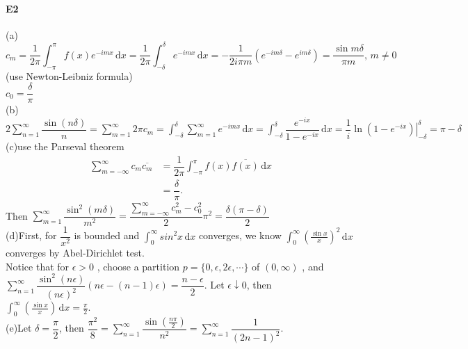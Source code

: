 \documentclass{article}
\begin{document}
\paragraph{E2}
(a) 
\[ c_m=\dfrac{1}{2\pi}\int_{-\pi }^{\pi } f(x)e^{-imx}\, \mathrm{d}x =\dfrac{1 }{2\pi }\int_{-\delta}^{\delta} e^{-imx}\, \mathrm{d}x=-\dfrac{1}{2i\pi m}(e^{-im\delta}-e^{im\delta})=\dfrac{\sin{m\delta}}{\pi m} ,\,m\not=0  \] (use Newton-Leibniz formula) \\ $ c_0=\dfrac{\delta}{\pi } $\\ 
(b) $ 2\sum\limits_{n=1 }^{\infty } \dfrac{\sin(n\delta)}{n}=\sum\limits_{m=1 }^{\infty}2\pi c_m=\int_{-\delta }^{\delta } \sum\limits_{m=1 }^{\infty } e^{-imx}\, \mathrm{d}x=\int_{-\delta }^{\delta } \dfrac{e^{-ix}}{1-e^{-ix}} \, \mathrm{d}x=\dfrac{1 }{i}\left.\ln(1-e^{-ix})\right|_{-\delta}^{\delta}=\pi-\delta     $ \\
(c)use the Parseval theorem
 \begin{align*}
    \sum\limits_{m=-\infty}^{\infty} c_m\overline{c_m}&=\dfrac{1}{2\pi}\int_{-\pi }^{\pi } f(x)\overline{f(x)}\, \mathrm{d}x \\
    &=\dfrac{\delta  }{\pi } .  
\end{align*}
Then  $ \sum\limits_{m=1 }^{\infty } \dfrac{\sin^2(m\delta)}{m^2}=\dfrac{\sum\limits_{m=-\infty }^{\infty }c_m^2-c_0^2 }{2}\pi^2= \dfrac{\delta(\pi-\delta)}{2}$ \\
(d)First, for  $ \dfrac{1 }{x^2} $ is bounded and  $ \int_{0}^{\infty } sin^2x\, \mathrm{d}x   $ converges, we know  $ \int_{0}^{\infty} (\frac{\sin{x }}{x})^2\, \mathrm{d}x   $ converges by Abel-Dirichlet test.\\
Notice that for  $ \epsilon>0 $ , choose a partition  $ p=\{0,\epsilon,2\epsilon,\cdots\}  $ of  $ (0,\infty) $ ,
and  $ \sum\limits_{n=1}^{\infty}\dfrac{\sin^2(n\epsilon)}{(n\epsilon)^2}(n\epsilon-(n-1)\epsilon)=\dfrac{n-\epsilon}{2}  $.
Let  $ \epsilon\downarrow0 $, then  $ \int_{0 }^{\infty } (\frac{\sin{x}}{x})\, \mathrm{d}x=\frac{\pi }{2}   $.  \\
(e)Let  $ \delta=\dfrac{\pi}{2} $, then  $ \dfrac{\pi^2}{8} =\sum\limits_{n=1}^{\infty}\dfrac{\sin(\frac{n\pi }{2})}{n^2}=\sum\limits_{n=1}^{\infty} \dfrac{1 }{(2n-1)^2} $.
\end{document}
